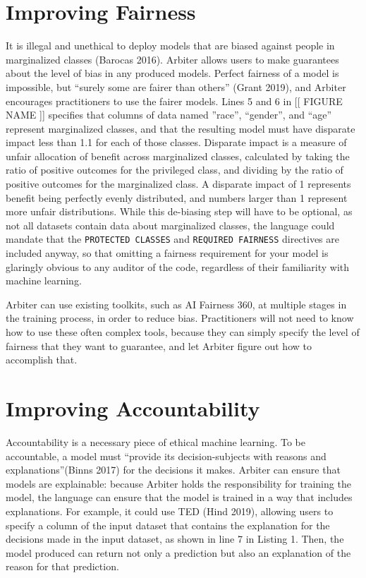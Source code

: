 \documentclass[letterpaper]{article}
\begin{document}
\section{Improving Fairness}
It is illegal and unethical to deploy models that are biased against people in marginalized classes (Barocas 2016). Arbiter allows users to make guarantees about the level of bias in any produced models. Perfect fairness of a model is impossible, but ``surely some are fairer than others” (Grant 2019), and Arbiter encourages practitioners to use the fairer models. Lines 5 and 6 in [[ FIGURE NAME ]] specifies that columns of data named ''race”, “gender”, and “age” represent marginalized classes, and that the resulting model must have disparate impact less than 1.1 for each of those classes. Disparate impact is a measure of unfair allocation of benefit across marginalized classes, calculated by taking the ratio of positive outcomes for the privileged class, and dividing by the ratio of positive outcomes for the marginalized class. A disparate impact of 1 represents benefit being perfectly evenly distributed, and numbers larger than 1 represent more unfair distributions. While this de-biasing step will have to be optional, as not all datasets contain data about marginalized classes, the language could mandate that the \texttt{PROTECTED CLASSES} and \texttt{REQUIRED FAIRNESS} directives are included anyway, so that omitting a fairness requirement for your model is glaringly obvious to any auditor of the code, regardless of their familiarity with machine learning.

Arbiter can use existing toolkits, such as AI Fairness 360, at multiple stages in the training process, in order to reduce bias. Practitioners will not need to know how to use these often complex tools, because they can simply specify the level of fairness that they want to guarantee, and let Arbiter figure out how to accomplish that.

\section{Improving Accountability}
Accountability is a necessary piece of ethical machine learning. To be accountable, a model must ``provide its decision-subjects with reasons and explanations”(Binns 2017) for the decisions it makes. Arbiter can ensure that models are explainable: because Arbiter holds the responsibility for training the model, the language can ensure that the model is trained in a way that includes explanations. For example, it could use TED (Hind 2019), allowing users to specify a column of the input dataset that contains the explanation for the decisions made in the input dataset, as shown in line 7 in Listing 1. Then, the model produced can return not only a prediction but also an explanation of the reason for that prediction.
\end{document}
